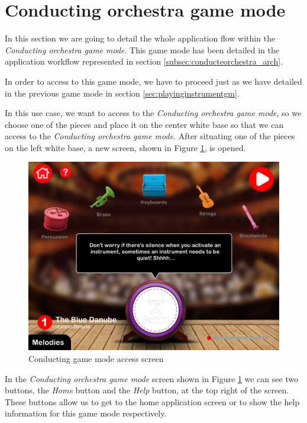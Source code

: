 \section{Conducting orchestra game mode}
\label{sec:conductingorchestragm}

In this section we are going to detail the whole application flow within the \textit{Conducting orchestra game mode}. This game mode has been detailed in the application workflow represented in section \ref{subsec:conducteorchestra_arch}.

In order to access to this game mode, we have to proceed just as we have detailed in the previous game mode in section \ref{sec:playinginstrumentgm}.

In this use case, we want to access to the \textit{Conducting orchestra game mode}, so we choose one of the pieces and place it on the center white base so that we can access to the \textit{Conducting orchestra game mode}. After situating one of the pieces on the left white base, a new screen, shown in Figure \ref{fig:conducting_home_screen}, is opened.

\begin{figure}[ht!]
	\centering
	\includegraphics[width=400pt]{graphics/use-case/conducting_home_screen.jpg}
	\caption{Conducting game mode access screen}
	\label{fig:conducting_home_screen}
\end{figure}

\FloatBarrier

In the \textit{Conducting orchestra game mode} screen shown in Figure \ref{fig:conducting_home_screen} we can see two buttons, the \textit{Home} button and the \textit{Help} button, at the top right of the screen. These buttons allow us to get to the home application screen or to show the help information for this game mode respectively.

